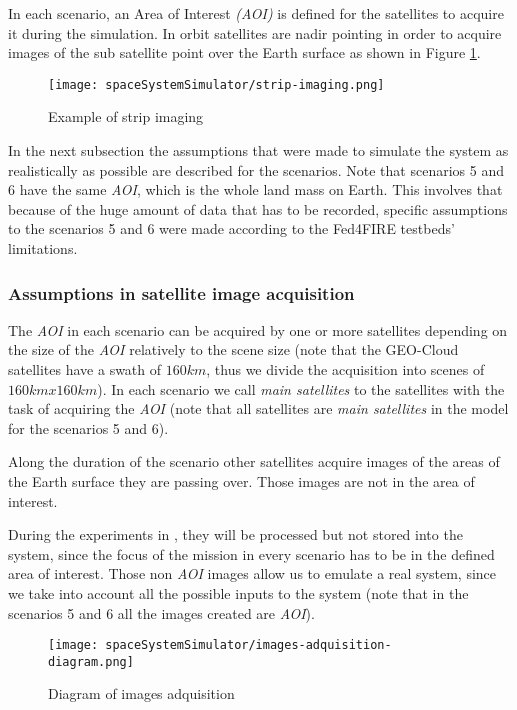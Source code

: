 In each scenario, an Area of Interest \emph{(AOI)} is defined for the satellites to acquire it during the simulation. In orbit satellites are nadir pointing in order to acquire images of the sub satellite point over the Earth surface as shown in Figure \ref{fig:sss-example-strip}.
\begin{figure}[!h]
\begin{center}
\texttt{[image: spaceSystemSimulator/strip-imaging.png]}
\caption{Example of strip imaging}
\label{fig:sss-example-strip}
\end{center}
\end{figure}

In the next subsection the assumptions that were made to simulate the system as realistically as possible are described for the scenarios. Note that scenarios 5 and 6 have the same \emph{AOI}, which is the whole land mass on Earth. This involves that because of the huge amount of data that has to be recorded, specific assumptions to the scenarios 5 and 6 were made according to the Fed4FIRE testbeds’ limitations.

\subsubsection{Assumptions in satellite image acquisition}
\label{subsubsec:assumptions}

The \emph{AOI} in each scenario can be acquired by one or more satellites depending on
the size of the \emph{AOI} relatively to the scene size (note that the GEO-Cloud
satellites have a swath of $160km$, thus we divide the acquisition into scenes of
$160km x 160km$).
In each scenario we call \emph{main satellites} to the satellites with the task
of acquiring the \emph{AOI} (note that all satellites are \emph{main satellites} in the
model for the scenarios 5 and 6).

Along the duration of the scenario other satellites acquire images of the areas
of the Earth surface they are passing over. Those images are not in the area of
interest.

During the experiments in \bonfire, they will be processed but not stored into the system, since the focus of the mission in every scenario has to be in the defined area of interest. Those non \emph{AOI} images allow us to emulate a real system, since we take into account all the possible inputs to the system (note that in the scenarios 5 and 6 all the images created are \emph{AOI}).


\begin{figure}[!h]
\begin{center}
\texttt{[image: spaceSystemSimulator/images-adquisition-diagram.png]}
\caption{Diagram of images adquisition}
\label{fig:sss-acquisition-diagram}
\end{center}
\end{figure}

